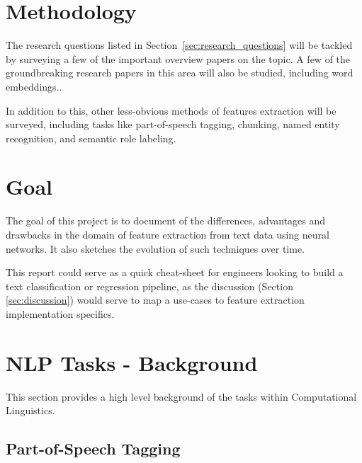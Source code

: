 \documentclass[11pt,a4paper]{article}
\begin{document}

\section{Methodology} %
\label{sec:methodology}

  The research questions listed in Section~\ref{sec:research_questions} will be tackled by surveying a few of the important overview papers on the topic\cite{goldberg2016primer}\cite{bengio2003neural}\cite{morin2005hierarchical}. A few of the groundbreaking research papers in this area will also be studied, including word embeddings.\cite{mikolov2013efficient}\cite{mikolov2013distributed}\cite{mikolov2013linguistic}.

  In addition to this, other less-obvious methods of features extraction will be surveyed, including tasks like part-of-speech tagging, chunking, named entity recognition, and semantic role labeling\cite{socher2011parsing}\cite{luong2013better}\cite{maas2015lexicon}\cite{li2015hierarchical}\cite{collobert2011natural}\cite{pennington2014glove}.


\section{Goal} %
\label{sec:goal}

  The goal of this project is to document of the differences, advantages and drawbacks in the domain of feature extraction from text data using neural networks. It also sketches the evolution of such techniques over time.

  This report could serve as a quick cheat-sheet for engineers looking to build a text classification or regression pipeline, as the discussion (Section \ref{sec:discussion}) would serve to map a use-cases to feature extraction implementation specifics.



\section{NLP Tasks - Background} %
\label{sec:nlp_tasks_background}

  This section provides a high level background of the tasks within Computational Linguistics.

  \subsection{Part-of-Speech Tagging} %
  \label{sub:part_of_speech_tagging}
\end{document}
